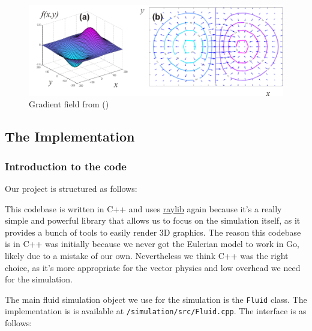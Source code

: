 \documentclass[a4paper,12pt,titlepage]{article}
\begin{document}
\begin{figure}[H]
	\centering
	\includegraphics[width=15cm]{resources/gradient_field.png}
	\caption{Gradient field from (\cite{christophefinot})}
	\label{fig:gradient_field}
\end{figure}

\subsection{The Implementation} \label{implementation}
\subsubsection{Introduction to the code}
Our project is structured as follows:

This codebase is written in C++ and uses \href{https://www.raylib.com/}{raylib} again
because it's a really simple and powerful library that allows us to focus on the
simulation itself, as it provides a bunch of tools to easily render 3D graphics.
The reason this codebase is in C++ was initially because we never got the Eulerian
model to work in Go, likely due to a mistake of our own. Nevertheless we think C++
was the right choice, as it's more appropriate for the vector physics and low overhead
we need for the simulation.

The main fluid simulation object we use for the simulation is the \lstinline{Fluid} class.
The implementation is is available at \lstinline{/simulation/src/Fluid.cpp}.
The interface is as follows:
\end{document}
